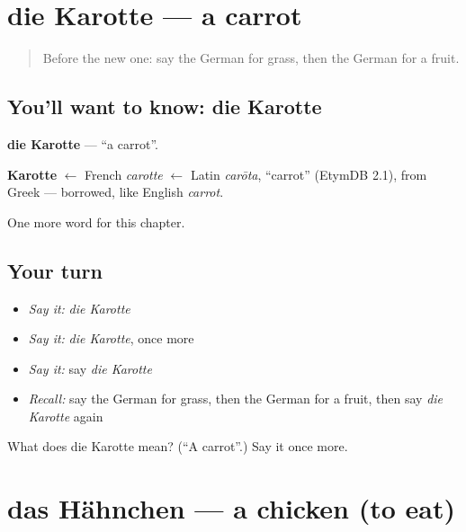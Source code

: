 \section[die Karotte]{die Karotte — a carrot}

\label{lesson:GE-C199-karotte}



\begin{quote}
Before the new one: say the German for grass, then the German for a fruit.
\end{quote}

\subsection*{You'll want to know: die Karotte}
\textbf{die Karotte} — \textquotedblleft{}a carrot\textquotedblright{}.

\begin{cousinweb}
\textbf{Karotte} $\leftarrow$ French \emph{carotte} $\leftarrow$ Latin \emph{carōta}, \textquotedblleft{}carrot\textquotedblright{} (EtymDB 2.1), from Greek — borrowed, like English \emph{carrot}.
\end{cousinweb}

\begin{grammarlens}[title={What you've built}]
One more word for this chapter.
\end{grammarlens}

\subsection*{Your turn}
\begin{itemize}
\raggedright
  \item \emph{Say it:} \emph{die Karotte}
  \item \emph{Say it:} \emph{die Karotte}, once more
  \item \emph{Say it:} say \emph{die Karotte}
  \item \emph{Recall:} say the German for grass, then the German for a fruit, then say \emph{die Karotte} again
\end{itemize}

\begin{tcolorbox}[breakable,colback=teal!4,colframe=teal!35!black,title={Before you move on}]
What does die Karotte mean? (\textquotedblleft{}A carrot\textquotedblright{}.) Say it once more.
\end{tcolorbox}
\section[das Hähnchen]{das Hähnchen — a chicken (to eat)}

